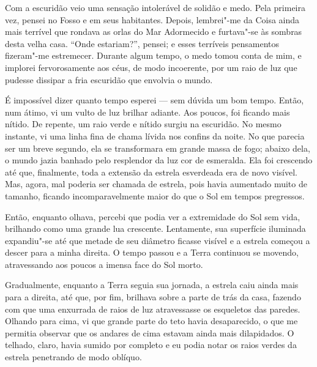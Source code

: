 Com a escuridão veio uma sensação intolerável de solidão e medo. Pela primeira vez, pensei no Fosso e em seus
habitantes. Depois, lembrei"-me da Coisa ainda mais terrível que rondava as orlas do Mar Adormecido e furtava"-se às
sombras desta velha casa. ``Onde estariam?'', pensei; e esses terríveis pensamentos fizeram"-me estremecer. Durante algum
tempo, o medo tomou conta de mim, e implorei fervorosamente aos céus, de modo incoerente, por um raio de luz que
pudesse dissipar a fria escuridão que envolvia o mundo.

É impossível dizer quanto tempo esperei --- sem dúvida um bom tempo. Então, num átimo, vi um vulto de luz brilhar
adiante. Aos poucos, foi ficando mais nítido. De repente, um raio verde e nítido surgiu na escuridão. No mesmo
instante, vi uma linha fina de chama lívida nos confins da noite. No que parecia ser um breve segundo, ela se
transformara em grande massa de fogo; abaixo dela, o mundo jazia banhado pelo resplendor da luz cor de esmeralda.
Ela foi crescendo até que, finalmente, toda a extensão da estrela esverdeada era de novo visível. Mas, agora, mal
poderia ser chamada de estrela, pois havia aumentado muito de tamanho, ficando incomparavelmente maior do que o
Sol em tempos pregressos.

Então, enquanto olhava, percebi que podia ver a extremidade do Sol sem vida, brilhando como uma grande lua crescente.
Lentamente, sua superfície iluminada expandiu"-se até que metade de seu diâmetro ficasse visível e a estrela começou a
descer para a minha direita. O tempo passou e a Terra continuou se movendo, atravessando aos poucos a imensa face do
Sol morto.

Gradualmente, enquanto a Terra seguia sua jornada, a estrela caiu ainda mais para a direita, até que, por fim,
brilhava sobre a parte de trás da casa, fazendo com que uma enxurrada de raios de luz atravessasse os esqueletos das
paredes. Olhando para cima, vi que grande parte do teto havia desaparecido, o que me permitia observar que os andares de
cima estavam ainda mais dilapidados. O telhado, claro, havia sumido por completo e eu podia notar os raios
verdes da estrela penetrando de modo oblíquo. 


